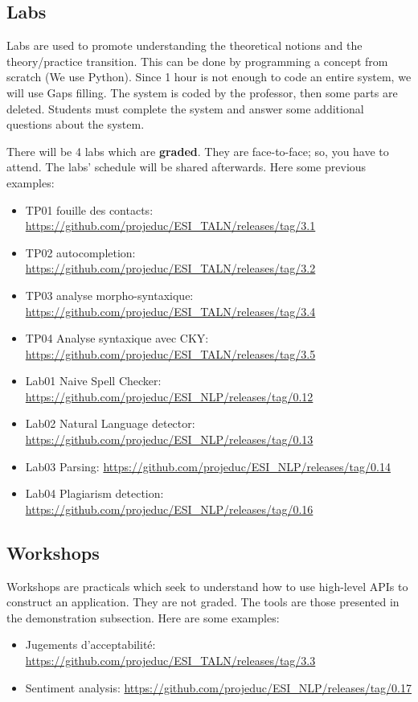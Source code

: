 \documentclass[11pt, a4paper]{article}
\begin{document}
\subsection{Labs}

Labs are used to promote understanding the theoretical notions and the theory/practice transition.
This can be done by programming a concept from scratch (We use Python).
Since 1 hour is not enough to code an entire system, we will use Gaps filling.
The system is coded by the professor, then some parts are deleted.
Students must complete the system and answer some additional questions about the system.

There will be 4 labs which are \textbf{graded}.
They are face-to-face; so, you have to attend.
The labs' schedule will be shared afterwards.
Here some previous examples:
\begin{itemize}
	\item TP01 fouille des contacts: \url{https://github.com/projeduc/ESI_TALN/releases/tag/3.1}
	\item TP02 autocompletion: \url{https://github.com/projeduc/ESI_TALN/releases/tag/3.2}
	\item TP03 analyse morpho-syntaxique: \url{https://github.com/projeduc/ESI_TALN/releases/tag/3.4}
	\item TP04 Analyse syntaxique avec CKY: \url{https://github.com/projeduc/ESI_TALN/releases/tag/3.5}
	\item Lab01 Naive Spell Checker: \url{https://github.com/projeduc/ESI_NLP/releases/tag/0.12}
	\item Lab02 Natural Language detector: \url{https://github.com/projeduc/ESI_NLP/releases/tag/0.13}
	\item Lab03 Parsing: \url{https://github.com/projeduc/ESI_NLP/releases/tag/0.14}
	\item Lab04 Plagiarism detection: \url{https://github.com/projeduc/ESI_NLP/releases/tag/0.16}
\end{itemize}

\subsection{Workshops}

Workshops are practicals which seek to understand how to use high-level APIs to construct an application.
They are not graded.
The tools are those presented in the demonstration subsection.
Here are some examples:
\begin{itemize}
	\item Jugements d'acceptabilité: \url{https://github.com/projeduc/ESI_TALN/releases/tag/3.3}
	\item Sentiment analysis: \url{https://github.com/projeduc/ESI_NLP/releases/tag/0.17}
\end{itemize}
\end{document}
